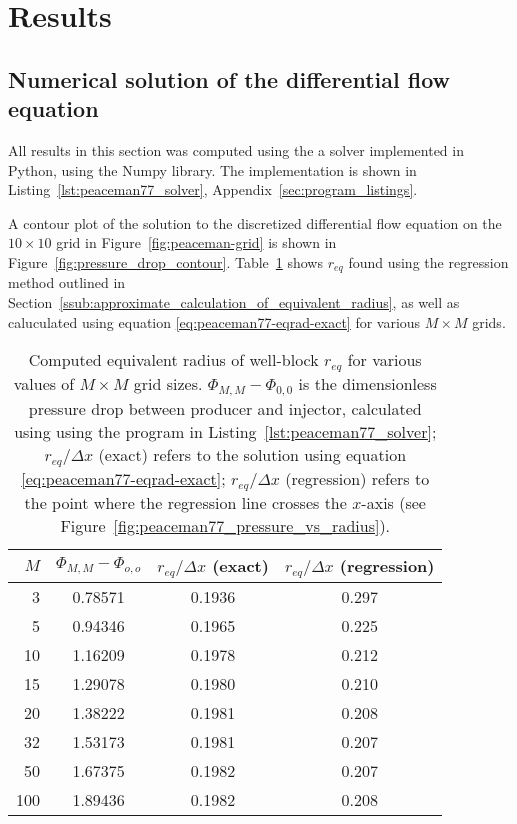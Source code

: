 
\section{Results} %
\label{sec:results}




\subsection{Numerical solution of the differential flow equation} %
\label{sub:numerical_solution_of_the_differential_flow_equation}
All results in this section was computed using the a solver implemented in Python, using the Numpy library. The implementation is shown in Listing~\ref{lst:peaceman77_solver}, Appendix~\ref{sec:program_listings}.

A contour plot of the solution to the discretized differential flow equation on the $10 \times 10$ grid in Figure~\ref{fig:peaceman-grid} is shown in Figure~\ref{fig:pressure_drop_contour}. Table~\ref{tbl:peaceman-results} shows $r_{eq}$ found using the regression method outlined in Section~\ref{ssub:approximate_calculation_of_equivalent_radius}, as well as caluculated using equation \eqref{eq:peaceman77-eqrad-exact} for various $M\times M$ grids.

\begin{table}[H]
    \centering
    \caption{Computed equivalent radius of well-block $r_{eq}$ for various values of $M\times M$ grid sizes. $\Phi_{M,M} - \Phi_{0,0}$ is the dimensionless pressure drop between producer and injector, calculated using using the program in Listing~\ref{lst:peaceman77_solver}; $r_{eq}/\Delta x$ (exact) refers to the solution using equation \eqref{eq:peaceman77-eqrad-exact}; $r_{eq} / \Delta x$ (regression) refers to the point where the regression line crosses the $x$-axis (see Figure~\ref{fig:peaceman77_pressure_vs_radius}).}
    \begin{tabular}{rccc}
        \toprule
        $M$ & $\Phi_{M,M} - \Phi_{o,o}$ & $r_{eq}/\Delta x$ (exact) & $r_{eq} / \Delta x$ (regression)\\
        \midrule
        3   & 0.78571 & 0.1936 & 0.297 \\
        5   & 0.94346 & 0.1965 & 0.225 \\
        10  & 1.16209 & 0.1978 & 0.212 \\
        15  & 1.29078 & 0.1980 & 0.210 \\
        20  & 1.38222 & 0.1981 & 0.208 \\
        32  & 1.53173 & 0.1981 & 0.207 \\
        50  & 1.67375 & 0.1982 & 0.207 \\
        100 & 1.89436 & 0.1982 & 0.208 \\
        \bottomrule
    \end{tabular}
    \label{tbl:peaceman-results}
\end{table}

